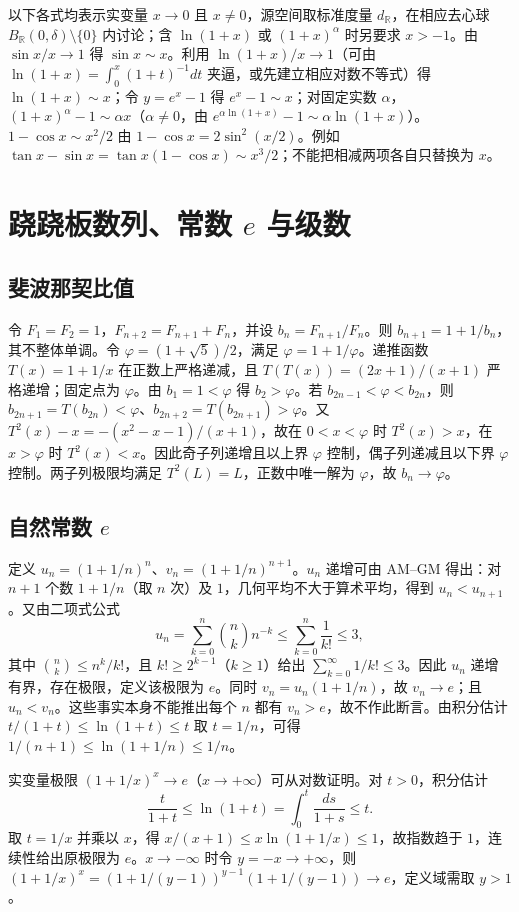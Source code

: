 \documentclass[11pt,a4paper,UTF8]{ctexart}
\theoremstyle{definition}\newtheorem{definition}[theorem]{定义}
\theoremstyle{remark}\newtheorem{remark}[theorem]{说明}
\begin{document}
以下各式均表示实变量 $x\to0$ 且 $x\ne0$，源空间取标准度量 $d_{\mathbb R}$，在相应去心球 $B_{\mathbb R}(0,\delta)\setminus\{0\}$ 内讨论；含 $\ln(1+x)$ 或 $(1+x)^\alpha$ 时另要求 $x>-1$。由 $\sin x/x\to1$ 得 $\sin x\sim x$。利用 $\ln(1+x)/x\to1$（可由 $\ln(1+x)=\int_0^x(1+t)^{-1}dt$ 夹逼，或先建立相应对数不等式）得 $\ln(1+x)\sim x$；令 $y=e^x-1$ 得 $e^x-1\sim x$；对固定实数 $\alpha$，$ (1+x)^\alpha-1\sim\alpha x$（$\alpha\ne0$，由 $e^{\alpha\ln(1+x)}-1\sim\alpha\ln(1+x)$）。$1-\cos x\sim x^2/2$ 由 $1-\cos x=2\sin^2(x/2)$。例如 $\tan x-\sin x=\tan x(1-\cos x)\sim x^3/2$；不能把相减两项各自只替换为 $x$。

\section{跷跷板数列、常数 \texorpdfstring{$e$}{e} 与级数}
\subsection{斐波那契比值}
令 $F_1=F_2=1$，$F_{n+2}=F_{n+1}+F_n$，并设 $b_n=F_{n+1}/F_n$。则 $b_{n+1}=1+1/b_n$，其不整体单调。令 $\varphi=(1+\sqrt5)/2$，满足 $\varphi=1+1/\varphi$。递推函数 $T(x)=1+1/x$ 在正数上严格递减，且 $T(T(x))=(2x+1)/(x+1)$ 严格递增；固定点为 $\varphi$。由 $b_1=1<\varphi$ 得 $b_2>\varphi$。若 $b_{2n-1}<\varphi<b_{2n}$，则 $b_{2n+1}=T(b_{2n})<\varphi$、$b_{2n+2}=T(b_{2n+1})>\varphi$。又 $T^2(x)-x=-(x^2-x-1)/(x+1)$，故在 $0<x<\varphi$ 时 $T^2(x)>x$，在 $x>\varphi$ 时 $T^2(x)<x$。因此奇子列递增且以上界 $\varphi$ 控制，偶子列递减且以下界 $\varphi$ 控制。两子列极限均满足 $T^2(L)=L$，正数中唯一解为 $\varphi$，故 $b_n\to\varphi$。

\subsection{自然常数 \texorpdfstring{$e$}{e}}
定义 $u_n=(1+1/n)^n$、$v_n=(1+1/n)^{n+1}$。$u_n$ 递增可由 AM--GM 得出：对 $n+1$ 个数 $1+1/n$（取 $n$ 次）及 $1$，几何平均不大于算术平均，得到 $u_n<u_{n+1}$。又由二项式公式
\[
u_n=\sum_{k=0}^n\binom nk n^{-k}\le\sum_{k=0}^n\frac1{k!}\le3,
\]
其中 $\binom nk\le n^k/k!$，且 $k!\ge2^{k-1}$（$k\ge1$）给出 $\sum_{k=0}^{\infty}1/k!\le3$。因此 $u_n$ 递增有界，存在极限，定义该极限为 $e$。同时 $v_n=u_n(1+1/n)$，故 $v_n\to e$；且 $u_n<v_n$。这些事实本身不能推出每个 $n$ 都有 $v_n>e$，故不作此断言。由积分估计 $t/(1+t)\le\ln(1+t)\le t$ 取 $t=1/n$，可得 $1/(n+1)\le\ln(1+1/n)\le1/n$。

实变量极限 $(1+1/x)^x\to e$（$x\to+\infty$）可从对数证明。对 $t>0$，积分估计
\[
\frac{t}{1+t}\le\ln(1+t)=\int_0^t\frac{ds}{1+s}\le t.
\]
取 $t=1/x$ 并乘以 $x$，得 $x/(x+1)\le x\ln(1+1/x)\le1$，故指数趋于 $1$，连续性给出原极限为 $e$。$x\to-\infty$ 时令 $y=-x\to+\infty$，则 $(1+1/x)^x=(1+1/(y-1))^{y-1}(1+1/(y-1))\to e$，定义域需取 $y>1$。
\end{document}
